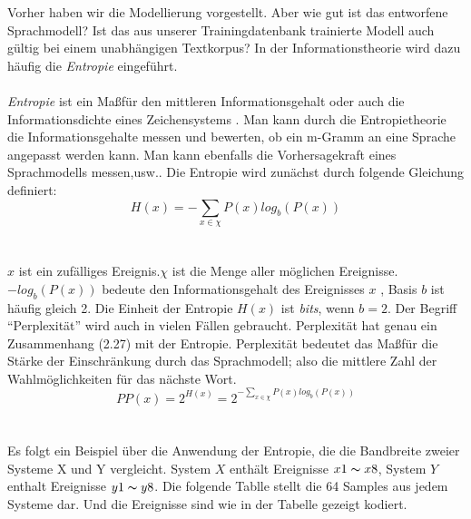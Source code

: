 Vorher haben wir die Modellierung vorgestellt. Aber wie gut ist das entworfene Sprachmodell? Ist das aus unserer Trainingdatenbank trainierte Modell auch g\"ultig bei einem unabh\"angigen Textkorpus? In der Informationstheorie wird dazu h\"aufig die \emph{Entropie}  eingef\"uhrt.
\\
\\
\emph{Entropie} ist ein Ma\ss f\"ur den mittleren Informationsgehalt oder auch die Informationsdichte eines Zeichensystems \cite{int_entropie}. Man kann durch die Entropietheorie die Informationsgehalte messen und bewerten, ob ein m-Gramm an eine Sprache angepasst werden kann. Man kann ebenfalls die Vorhersagekraft eines Sprachmodells messen,usw..\cite{book_speech}
Die Entropie wird zun\"achst durch folgende Gleichung definiert:
\begin{equation}
\label{equation:bewertung_01}
H(x)=-\sum_{x\in\chi}P(x)log_{b}(P(x))
\end{equation}
\\
\\
$x$ ist ein zuf\"alliges Ereignis.$\chi$ ist die Menge aller m\"oglichen Ereignisse. $-log_{b}(P(x))$ bedeute den Informationsgehalt des Ereignisses $x$ , Basis $b$ ist h\"aufig gleich 2. Die Einheit der Entropie $H(x)$ ist \emph{bits}, wenn $b=2$.
Der Begriff "`Perplexit\"at"' wird auch in vielen F\"allen gebraucht. Perplexit\"at hat genau ein Zusammenhang (2.27) mit der Entropie. Perplexit\"at bedeutet das Ma\ss f\"ur die St\"arke der Einschr\"ankung durch das Sprachmodell; also die mittlere Zahl der Wahlm\"oglichkeiten f\"ur das n\"achste Wort.
\begin{equation}
\label{equation:bewertung_02}
PP(x)=2^{H(x)}=2^{-\sum_{x\in\chi}P(x)log_{b}(P(x))}
\end{equation}
\\
\\
Es folgt ein Beispiel \"uber die Anwendung der Entropie, die die Bandbreite zweier Systeme X und Y vergleicht. System $X$ enth\"alt Ereignisse $x1\thicksim x8$, System $Y$ enthalt Ereignisse $y1\thicksim y8$. Die folgende Tablle stellt die 64 Samples aus jedem Systeme dar. Und die Ereignisse sind wie in der Tabelle gezeigt kodiert.

